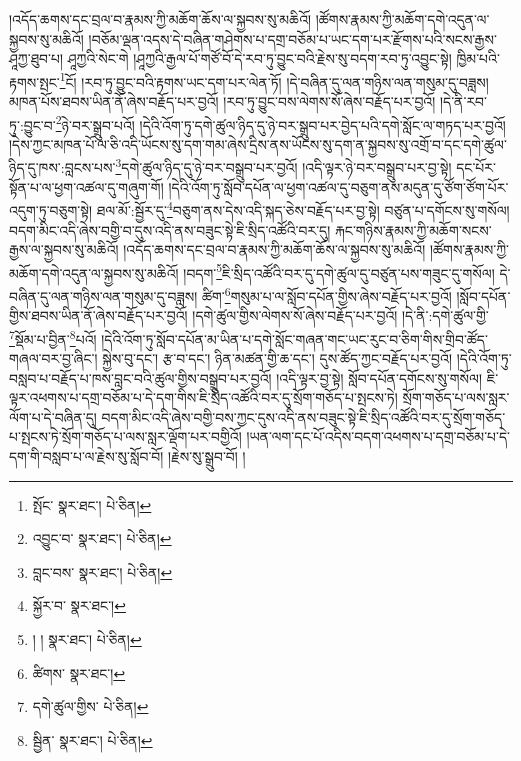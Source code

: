 །འདོད་ཆགས་དང་བྲལ་བ་རྣམས་ཀྱི་མཆོག་ཆོས་ལ་སྐྱབས་སུ་མཆིའོ། །ཚོགས་རྣམས་ཀྱི་མཆོག་དགེ་འདུན་ལ་སྐྱབས་སུ་མཆིའོ། །བཅོམ་ལྡན་འདས་དེ་བཞིན་གཤེགས་པ་དགྲ་བཅོམ་པ་ཡང་དག་པར་རྫོགས་པའི་སངས་རྒྱས་ཤཱཀྱ་ཐུབ་པ། ཤཱཀྱའི་སེང་གེ །ཤཱཀྱའི་རྒྱལ་པོ་གཙོ་བོ་དེ་རབ་ཏུ་བྱུང་བའི་རྗེས་སུ་བདག་རབ་ཏུ་འབྱུང་སྟེ། ཁྱིམ་པའི་རྟགས་སྤང་\footnote{སྤོང་  སྣར་ཐང་།  པེ་ཅིན། }ངོ། །རབ་ཏུ་བྱུང་བའི་རྟགས་ཡང་དག་པར་ལེན་ཏོ། །དེ་བཞིན་དུ་ལན་གཉིས་ལན་གསུམ་དུ་བཟླས། མཁན་པོས་ཐབས་ཡིན་ནོ་ཞེས་བརྗོད་པར་བྱའོ། །རབ་ཏུ་བྱུང་བས་ལེགས་སོ་ཞེས་བརྗོད་པར་བྱའོ། །དེ་ནི་རབ་ཏུ་:བྱུང་བ་\footnote{འབྱུང་བ་  སྣར་ཐང་།  པེ་ཅིན། }ཉེ་བར་སྒྲུབ་པའོ། །དེའི་འོག་ཏུ་དགེ་ཚུལ་ཉིད་དུ་ཉེ་བར་སྒྲུབ་པར་བྱེད་པའི་དགེ་སློང་ལ་གཏད་པར་བྱའོ། །དེས་ཀྱང་མཁན་པོ་ལ་ཅི་འདི་ཡོངས་སུ་དག་གམ་ཞེས་དྲིས་ནས་ཡོངས་སུ་དག་ན་སྐྱབས་སུ་འགྲོ་བ་དང་དགེ་ཚུལ་ཉིད་དུ་ཁས་:བླངས་པས་\footnote{བླང་བས་  སྣར་ཐང་།  པེ་ཅིན། }དགེ་ཚུལ་ཉིད་དུ་ཉེ་བར་བསྒྲུབ་པར་བྱའོ། །འདི་ལྟར་ཉེ་བར་བསྒྲུབ་པར་བྱ་སྟེ། དང་པོར་སྟོན་པ་ལ་ཕྱག་འཚལ་དུ་གཞུག་གོ། །དེའི་འོག་ཏུ་སློབ་དཔོན་ལ་ཕྱག་འཚལ་དུ་བཅུག་ནས་མདུན་དུ་ཙོག་ཙོག་པོར་འདུག་ཏུ་བཅུག་སྟེ། ཐལ་མོ་:སྦྱོར་དུ་\footnote{སྐྱོར་བ་  སྣར་ཐང་། }བཅུག་ནས་དེས་འདི་སྐད་ཅེས་བརྗོད་པར་བྱ་སྟེ། བཙུན་པ་དགོངས་སུ་གསོལ། བདག་མིང་འདི་ཞེས་བགྱི་བ་དུས་འདི་ནས་བཟུང་སྟེ་ཇི་སྲིད་འཚོའི་བར་དུ། རྐང་གཉིས་རྣམས་ཀྱི་མཆོག་སངས་རྒྱས་ལ་སྐྱབས་སུ་མཆིའོ། །འདོད་ཆགས་དང་བྲལ་བ་རྣམས་ཀྱི་མཆོག་ཆོས་ལ་སྐྱབས་སུ་མཆིའོ། །ཚོགས་རྣམས་ཀྱི་མཆོག་དགེ་འདུན་ལ་སྐྱབས་སུ་མཆིའོ། །བདག་\footnote{། །  སྣར་ཐང་།  པེ་ཅིན། }ཇི་སྲིད་འཚོའི་བར་དུ་དགེ་ཚུལ་དུ་བཙུན་པས་གཟུང་དུ་གསོལ། དེ་བཞིན་དུ་ལན་གཉིས་ལན་གསུམ་དུ་བཟླས། ཚིག་\footnote{ཚིགས་  སྣར་ཐང་། }གསུམ་པ་ལ་སློབ་དཔོན་གྱིས་ཞེས་བརྗོད་པར་བྱའོ། །སློབ་དཔོན་གྱིས་ཐབས་ཡིན་ནོ་ཞེས་བརྗོད་པར་བྱའོ། །དགེ་ཚུལ་གྱིས་ལེགས་སོ་ཞེས་བརྗོད་པར་བྱའོ། །དེ་ནི་:དགེ་ཚུལ་གྱི་\footnote{དགེ་ཚུལ་གྱིས་  པེ་ཅིན། }སྡོམ་པ་བྱིན་\footnote{སྦྱིན་  སྣར་ཐང་།  པེ་ཅིན། }པའོ། །དེའི་འོག་ཏུ་སློབ་དཔོན་མ་ཡིན་པ་དགེ་སློང་གཞན་གང་ཡང་རུང་བ་ཅིག་གིས་གྲིབ་ཚོད་གཞལ་བར་བྱ་ཞིང་། སྐྱེས་བུ་དང་། རྩ་བ་དང་། ཉིན་མཚན་གྱི་ཆ་དང་། དུས་ཚོད་ཀྱང་བརྗོད་པར་བྱའོ། །དེའི་འོག་ཏུ་བསླབ་པ་བརྗོད་པ་ཁས་བླང་བའི་ཚུལ་གྱིས་བསྒྲུབ་པར་བྱའོ། །འདི་ལྟར་བྱ་སྟེ། སློབ་དཔོན་དགོངས་སུ་གསོལ། ཇི་ལྟར་འཕགས་པ་དགྲ་བཅོམ་པ་དེ་དག་གིས་ཇི་སྲིད་འཚོའི་བར་དུ་སྲོག་གཅོད་པ་སྤངས་ཏེ། སྲོག་གཅོད་པ་ལས་སླར་ལོག་པ་དེ་བཞིན་དུ། བདག་མིང་འདི་ཞེས་བགྱི་བས་ཀྱང་དུས་འདི་ནས་བཟུང་སྟེ་ཇི་སྲིད་འཚོའི་བར་དུ་སྲོག་གཅོད་པ་སྤངས་ཏེ་སྲོག་གཅོད་པ་ལས་སླར་ལྡོག་པར་བགྱིའོ། །ཡན་ལག་དང་པོ་འདིས་བདག་འཕགས་པ་དགྲ་བཅོམ་པ་དེ་དག་གི་བསླབ་པ་ལ་རྗེས་སུ་སློབ་བོ། །རྗེས་སུ་སྒྲུབ་བོ། །
